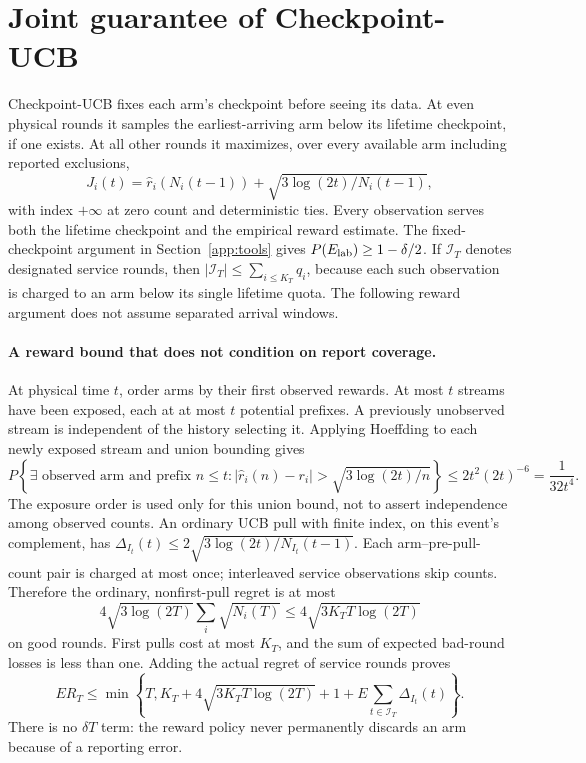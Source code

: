 \section{Joint guarantee of Checkpoint-UCB}
\label{app:joint}

Checkpoint-UCB fixes each arm's checkpoint before seeing its data. At even
physical rounds it samples the earliest-arriving arm below its lifetime
checkpoint, if one exists. At all other rounds it maximizes, over every
available arm including reported exclusions,
\[
 J_i(t)=\hat r_i(N_i(t-1))+
             \sqrt{3\log(2t)/N_i(t-1)},
\]
with index $+\infty$ at zero count and deterministic ties. Every observation
serves both the lifetime checkpoint and the empirical reward estimate.
The fixed-checkpoint argument in Section~\ref{app:tools} gives
$P(E_{\rm lab})\ge1-\delta/2$. If $\mathcal I_T$ denotes designated
service rounds, then $|\mathcal I_T|\le\sum_{i\le K_T}q_i$, because each
such observation is charged to an arm below its single lifetime quota.
The following reward argument does not assume separated arrival windows.


\paragraph{A reward bound that does not condition on report coverage.}
At physical time $t$, order arms by their first observed rewards. At most
$t$ streams have been exposed, each at at most $t$ potential prefixes. A
previously unobserved stream is independent of the history selecting it.
Applying Hoeffding to each newly exposed stream and union bounding gives
\[
 P\left\{\exists\text{ observed arm and prefix }n\le t:
 |\hat r_i(n)-r_i|>
        \sqrt{3\log(2t)/n}\right\}
 \le2t^2(2t)^{-6}=\frac1{32t^4}.
\]
The exposure order is used only for this union bound, not to assert
independence among observed counts. An ordinary UCB pull with finite index,
on this event's complement, has
$\Delta_{I_t}(t)\le2\sqrt{3\log(2t)/N_{I_t}(t-1)}$.
Each arm--pre-pull-count pair is charged at most once; interleaved service
observations skip counts. Therefore the ordinary, nonfirst-pull regret is
at most
\[
 4\sqrt{3\log(2T)}\sum_i\sqrt{N_i(T)}
 \le4\sqrt{3K_TT\log(2T)}
\]
on good rounds. First pulls cost at most $K_T$, and the sum of expected
bad-round losses is less than one. Adding the actual regret of service
rounds proves
\[
 ER_T\le\min\left\{T,K_T+4\sqrt{3K_TT\log(2T)}+1+
       E\sum_{t\in\mathcal I_T}\Delta_{I_t}(t)\right\}.
\]
There is no $\delta T$ term: the reward policy never permanently discards an
arm because of a reporting error.


